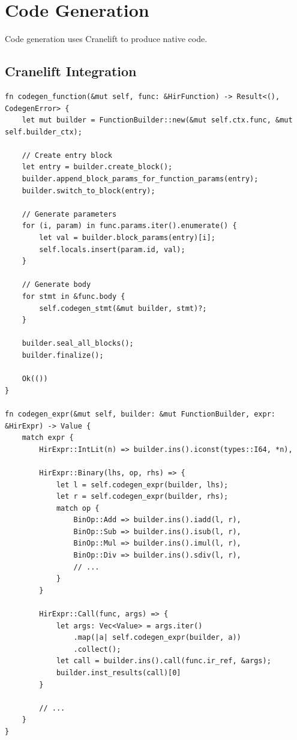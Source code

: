 \section{Code Generation}

Code generation uses Cranelift to produce native code.

\subsection{Cranelift Integration}

\begin{lstlisting}[language={}]
fn codegen_function(&mut self, func: &HirFunction) -> Result<(), CodegenError> {
    let mut builder = FunctionBuilder::new(&mut self.ctx.func, &mut self.builder_ctx);

    // Create entry block
    let entry = builder.create_block();
    builder.append_block_params_for_function_params(entry);
    builder.switch_to_block(entry);

    // Generate parameters
    for (i, param) in func.params.iter().enumerate() {
        let val = builder.block_params(entry)[i];
        self.locals.insert(param.id, val);
    }

    // Generate body
    for stmt in &func.body {
        self.codegen_stmt(&mut builder, stmt)?;
    }

    builder.seal_all_blocks();
    builder.finalize();

    Ok(())
}

fn codegen_expr(&mut self, builder: &mut FunctionBuilder, expr: &HirExpr) -> Value {
    match expr {
        HirExpr::IntLit(n) => builder.ins().iconst(types::I64, *n),

        HirExpr::Binary(lhs, op, rhs) => {
            let l = self.codegen_expr(builder, lhs);
            let r = self.codegen_expr(builder, rhs);
            match op {
                BinOp::Add => builder.ins().iadd(l, r),
                BinOp::Sub => builder.ins().isub(l, r),
                BinOp::Mul => builder.ins().imul(l, r),
                BinOp::Div => builder.ins().sdiv(l, r),
                // ...
            }
        }

        HirExpr::Call(func, args) => {
            let args: Vec<Value> = args.iter()
                .map(|a| self.codegen_expr(builder, a))
                .collect();
            let call = builder.ins().call(func.ir_ref, &args);
            builder.inst_results(call)[0]
        }

        // ...
    }
}
\end{lstlisting}

